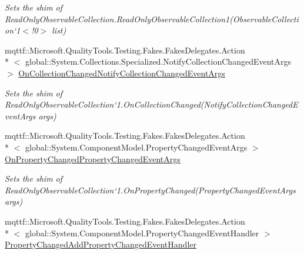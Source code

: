 \begin{DoxyCompactItemize}
\begin{DoxyCompactList}\small\item\em Sets the shim of Read\-Only\-Observable\-Collection{.\-Read\-Only\-Observable\-Collection}1(Observable\-Collection`1$<$!0$>$ list)\end{DoxyCompactList}\item 
mqttf\-::\-Microsoft.\-Quality\-Tools.\-Testing.\-Fakes.\-Fakes\-Delegates.\-Action\\*
$<$ global\-::\-System.\-Collections.\-Specialized.\-Notify\-Collection\-Changed\-Event\-Args $>$ \hyperlink{class_system_1_1_collections_1_1_object_model_1_1_fakes_1_1_shim_read_only_observable_collection_3_01_t_01_4_a3a8be502cc8198fc9513a1381ff10916}{On\-Collection\-Changed\-Notify\-Collection\-Changed\-Event\-Args}
\begin{DoxyCompactList}\small\item\em Sets the shim of Read\-Only\-Observable\-Collection`1.On\-Collection\-Changed(\-Notify\-Collection\-Changed\-Event\-Args args)\end{DoxyCompactList}\item 
mqttf\-::\-Microsoft.\-Quality\-Tools.\-Testing.\-Fakes.\-Fakes\-Delegates.\-Action\\*
$<$ global\-::\-System.\-Component\-Model.\-Property\-Changed\-Event\-Args $>$ \hyperlink{class_system_1_1_collections_1_1_object_model_1_1_fakes_1_1_shim_read_only_observable_collection_3_01_t_01_4_aa61b350450e6e092c8eebbfa3b37087e}{On\-Property\-Changed\-Property\-Changed\-Event\-Args}
\begin{DoxyCompactList}\small\item\em Sets the shim of Read\-Only\-Observable\-Collection`1.On\-Property\-Changed(\-Property\-Changed\-Event\-Args args)\end{DoxyCompactList}\item 
mqttf\-::\-Microsoft.\-Quality\-Tools.\-Testing.\-Fakes.\-Fakes\-Delegates.\-Action\\*
$<$ global\-::\-System.\-Component\-Model.\-Property\-Changed\-Event\-Handler $>$ \hyperlink{class_system_1_1_collections_1_1_object_model_1_1_fakes_1_1_shim_read_only_observable_collection_3_01_t_01_4_a18c13451032bf3fbdbab4b9ea6e48e62}{Property\-Changed\-Add\-Property\-Changed\-Event\-Handler}

\end{DoxyCompactItemize}
